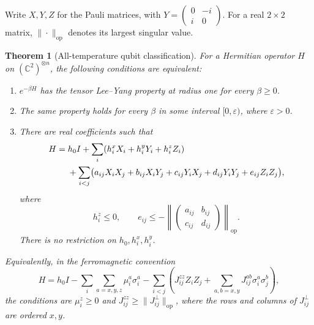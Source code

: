 \documentclass[reqno]{amsart}
\newtheorem{theorem}{Theorem}[section]
\theoremstyle{definition}
\theoremstyle{remark}
\newcommand{\C}{\mathbb C}
\begin{document}
Write \(X,Y,Z\) for the Pauli matrices, with
\(Y=\left(\begin{smallmatrix}0&-i\\ i&0\end{smallmatrix}\right)\).
For a real \(2\times2\) matrix, \(\|\cdot\|_{\mathrm{op}}\)
denotes its largest singular value.

\begin{theorem}[All-temperature qubit classification]\label{eq:sf}
For a Hermitian operator \(H\) on \((\C^2)^{\otimes n}\), the
following conditions are equivalent:
\begin{enumerate}
\item \(e^{-\beta H}\) has the tensor Lee--Yang property at radius
one for every \(\beta\ge0\).
\item The same property holds for every \(\beta\) in some interval
\([0,\varepsilon)\), where \(\varepsilon>0\).
\item There are real coefficients such that
\begin{align}
 H={}&h_0 I+\sum_i(h_i^xX_i+h_i^yY_i+h_i^zZ_i)\notag\\
 &+\sum_{i<j}\bigl(a_{ij}X_iX_j+b_{ij}X_iY_j
           +c_{ij}Y_iX_j+d_{ij}Y_iY_j+e_{ij}Z_iZ_j\bigr),
 \label{eq:sf-form}
\end{align}
where
\begin{equation}\label{eq:sf-inequality}
 h_i^z\le0,\qquad
 e_{ij}\le-
 \left\|\begin{pmatrix}a_{ij}&b_{ij}\\c_{ij}&d_{ij}\end{pmatrix}
 \right\|_{\mathrm{op}}.
\end{equation}
There is no restriction on \(h_0,h_i^x,h_i^y\).
\end{enumerate}
Equivalently, in the ferromagnetic convention
\begin{equation}\label{eq:ferromagnetic-convention}
 H=h_0I-\sum_i\sum_{a=x,y,z}\mu_i^a\sigma_i^a
 -\sum_{i<j}\left(J_{ij}^{zz}Z_iZ_j+
       \sum_{a,b=x,y}J_{ij}^{ab}\sigma_i^a\sigma_j^b\right),
\end{equation}
the conditions are
\(\mu_i^z\ge0\) and
\(J_{ij}^{zz}\ge\|J_{ij}^{\perp}\|_{\mathrm{op}}\), where the
rows and columns of \(J_{ij}^{\perp}\) are ordered \(x,y\).
\end{theorem}
\end{document}
